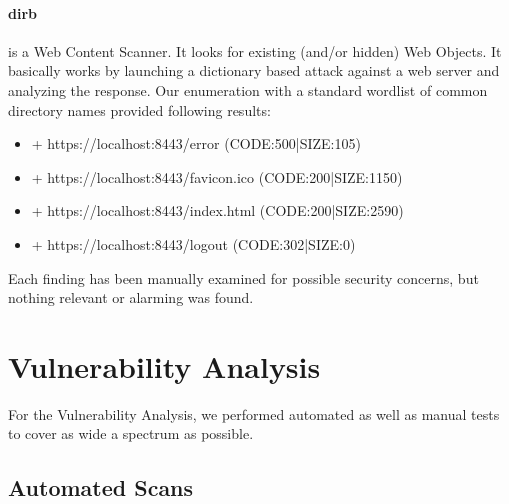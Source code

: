 \documentclass{scrreprt}
\begin{document}
\paragraph{dirb}
is a Web Content Scanner. It looks for existing (and/or hidden) Web Objects. It basically works by launching a dictionary based attack against a web server and analyzing the response. Our enumeration with a standard wordlist of common directory names provided following results: 
\begin{itemize}
	\item + https://localhost:8443/error (CODE:500|SIZE:105)                                                                                                                                                                
	\item + https://localhost:8443/favicon.ico (CODE:200|SIZE:1150)                                                                                                                                                         
	\item + https://localhost:8443/index.html (CODE:200|SIZE:2590)                                                                                                                                                          
	\item + https://localhost:8443/logout (CODE:302|SIZE:0)       
\end{itemize}

\noindent Each finding has been manually examined for possible security concerns, but nothing relevant or alarming was found.

\section{Vulnerability Analysis}
 
For the Vulnerability Analysis, we performed automated as well as manual tests to cover as wide a spectrum as possible.

\subsection{Automated Scans}
\end{document}
